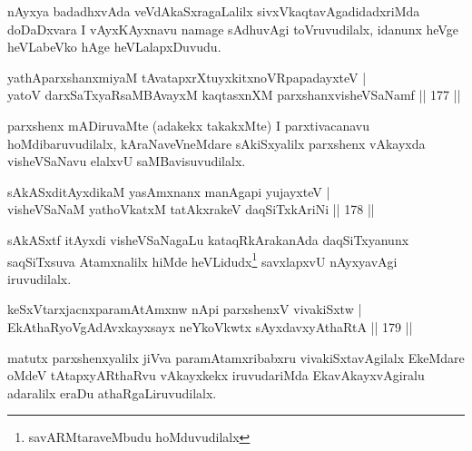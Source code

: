 \begin{artha}
nAyxya badadhxvAda veVdAkaSxragaLalilx sivxVkaqtavAgadidadxriMda doDaDxvara I vAyxKAyxnavu namage sAdhuvAgi toVruvudilalx, idanunx heVge heVLabeVko hAge heVLalapxDuvudu.
\end{artha}


\begin{shl}
yathAparxshanxmiyaM tAvatapxrXtuyxkitxnoVRpapadayxteV |\\
yatoV darxSaTxyaRsaMBAvayxM kaqtasxnXM parxshanxvisheVSaNamf \hfill || 177 ||
\end{shl}

\begin{artha}
parxshenx mADiruvaMte (adakekx takakxMte) I parxtivacanavu hoMdibaruvudilalx, kAraNaveVneMdare sAkiSxyalilx parxshenx vAkayxda visheVSaNavu elalxvU saMBavisuvudilalx.
\end{artha}


\begin{shl}
sAkASxditAyxdikaM yasAmxnanx manAgapi yujayxteV |\\
visheVSaNaM yathoVkatxM tatAkxrakeV daqSiTxkAriNi \hfill || 178 ||
\end{shl}

\begin{artha}
sAkASxtf itAyxdi visheVSaNagaLu kataqRkArakanAda daqSiTxyanunx saqSiTxsuva Atamxnalilx hiMde heVLidudx\footnote{savARMtaraveMbudu hoMduvudilalx} savxlapxvU nAyxyavAgi iruvudilalx.
\end{artha}

\begin{shl}
keSxVtarxjacnxparamAtAmxnw nApi parxshenxV vivakiSxtw |\\
EkAthaRyoVgAdAvxkayxsayx neYkoVkwtx sAyxdavxyAthaRtA \hfill || 179 ||
\end{shl}

\begin{artha}%
matutx parxshenxyalilx jiVva paramAtamxribabxru vivakiSxtavAgilalx EkeMdare oMdeV tAtapxyARthaRvu vAkayxkekx iruvudariMda EkavAkayxvAgiralu adaralilx eraDu athaRgaLiruvudilalx.
\end{artha}

